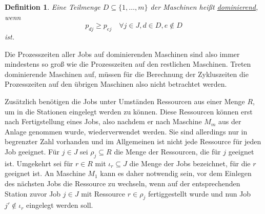 \documentclass{scrreprt}
\newtheorem{defi}{Definition}
\begin{document}
\begin{defi}
    Eine Teilmenge $D \subseteq \{1,\ldots,m\}$ der Maschinen heißt \underline{dominierend}, wenn 
    \[ p_{dj} \geq p_{ej} \quad \forall j\in J, d\in D, e\not\in D \] 
    ist. 
\end{defi}%
Die Prozesszeiten aller Jobs auf dominierenden Maschinen sind also immer mindestens so groß wie die Prozesszeiten auf den restlichen Maschinen.
Treten dominierende Maschinen auf, müssen für die Berechnung der Zykluszeiten die Prozesszeiten auf den übrigen Maschinen also nicht betrachtet werden.

Zusätzlich benötigen die Jobs unter Umständen Ressourcen aus einer Menge $R$, um in die Stationen eingelegt werden zu können. Diese Ressourcen können erst nach
Fertigstellung eines Jobs, also nachdem er nach Maschine $M_m$ aus der Anlage genommen wurde, wiederverwendet werden.
Sie sind allerdings nur in begrenzter Zahl vorhanden und im Allgemeinen ist nicht jede Ressource für jeden Job geeignet.
Für $j\in J$ sei $\rho_j\subseteq R$ die Menge der Ressourcen, die für $j$ geeignet ist.
Umgekehrt sei für $r\in R$ mit $\iota_r\subseteq J$ die Menge der Jobs bezeichnet, für die $r$ geeignet ist.
An Maschine $M_1$ kann es daher notwendig sein, vor dem Einlegen des nächsten Jobs die Ressource zu wechseln, 
wenn auf der entsprechenden Station zuvor Job $j\in J$ mit Ressource $r\in\rho_j$ fertiggestellt wurde 
und nun Job $j'\not\in\iota_r$ eingelegt werden soll.
\end{document}
